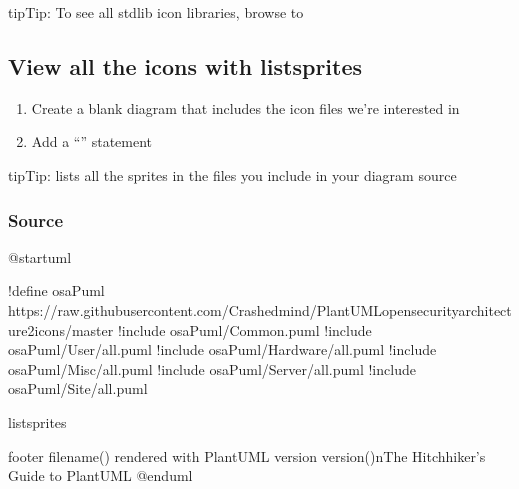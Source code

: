 \documentclass[letterpaper,10pt,english]{sphinxmanual}
\begin{document}
\begin{sphinxadmonition}{tip}{Tip:}
To see all stdlib icon libraries, browse to 
\end{sphinxadmonition}


\subsection{View all the icons with listsprites}
\label{\detokenize{NetworkUsersMachines/NetworkUsersMachines:view-all-the-icons-with-listsprites}}\begin{enumerate}
%
\item {} 
Create a blank diagram that includes the icon files we’re interested in

\item {} 
Add a “” statement

\end{enumerate}

\begin{sphinxadmonition}{tip}{Tip:}
 lists all the sprites in the files you include in your diagram source
\end{sphinxadmonition}

\begin{figure}[htbp]
\centering
\capstart

\caption{}\label{\detokenize{NetworkUsersMachines/NetworkUsersMachines:id16}}\end{figure}


\subsubsection{Source}
\label{\detokenize{NetworkUsersMachines/NetworkUsersMachines:source}}
%
\begin{sphinxVerbatim}[commandchars=\\\{\},numbers=left,firstnumber=1,stepnumber=1]
@startuml

!define osaPuml https://raw.githubusercontent.com/Crashedmind/PlantUML\PYGZhy{}opensecurityarchitecture2\PYGZhy{}icons/master
!include osaPuml/Common.puml
!include osaPuml/User/all.puml
!include osaPuml/Hardware/all.puml
!include osaPuml/Misc/all.puml
!include osaPuml/Server/all.puml
!include osaPuml/Site/all.puml

listsprites

footer \PYGZpc{}filename() rendered with PlantUML version \PYGZpc{}version()\PYGZbs{}nThe Hitchhiker’s Guide to PlantUML
@enduml
\end{sphinxVerbatim}
\sphinxresetverbatimhllines
\end{document}
